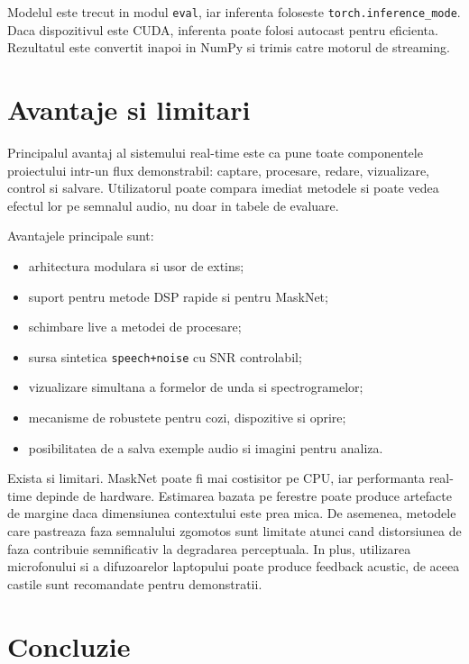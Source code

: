 Modelul este trecut in modul \texttt{eval}, iar inferenta foloseste
\texttt{torch.inference\_mode}. Daca dispozitivul este CUDA, inferenta poate
folosi autocast pentru eficienta. Rezultatul este convertit inapoi in NumPy si
trimis catre motorul de streaming.

\section{Avantaje si limitari}

Principalul avantaj al sistemului real-time este ca pune toate componentele
proiectului intr-un flux demonstrabil: captare, procesare, redare, vizualizare,
control si salvare. Utilizatorul poate compara imediat metodele si poate vedea
efectul lor pe semnalul audio, nu doar in tabele de evaluare.

Avantajele principale sunt:

\begin{itemize}
    \item arhitectura modulara si usor de extins;
    \item suport pentru metode DSP rapide si pentru MaskNet;
    \item schimbare live a metodei de procesare;
    \item sursa sintetica \texttt{speech+noise} cu SNR controlabil;
    \item vizualizare simultana a formelor de unda si spectrogramelor;
    \item mecanisme de robustete pentru cozi, dispozitive si oprire;
    \item posibilitatea de a salva exemple audio si imagini pentru analiza.
\end{itemize}

Exista si limitari. MaskNet poate fi mai costisitor pe CPU, iar performanta
real-time depinde de hardware. Estimarea bazata pe ferestre poate produce
artefacte de margine daca dimensiunea contextului este prea mica. De asemenea,
metodele care pastreaza faza semnalului zgomotos sunt limitate atunci cand
distorsiunea de faza contribuie semnificativ la degradarea perceptuala. In
plus, utilizarea microfonului si a difuzoarelor laptopului poate produce
feedback acustic, de aceea castile sunt recomandate pentru demonstratii.

\section{Concluzie}

